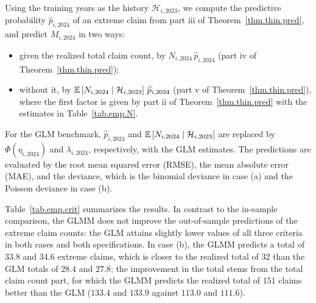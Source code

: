Using the training years as the history \(\mathcal H_{i,2023}\), we
compute the predictive probability \(\widehat p_{i,2024}\) of an extreme
claim from part iii of Theorem~\ref{thm.thin.pred}, and predict
\(M_{i,2024}\) in two ways:
\begin{itemize}
  \item[(a)] given the realized total claim count, by
  \(N_{i,2024}\,\widehat p_{i,2024}\) (part iv of
  Theorem~\ref{thm.thin.pred});
  \item[(b)] without it, by
  \({\mathbb E}\left[N_{i,2024}\mid\mathcal H_{i,2023}\right]\,\widehat p_{i,2024}\)
  (part v of Theorem~\ref{thm.thin.pred}), where the first factor is
  given by part ii of Theorem~\ref{thm.thin.pred} with the estimates in
  Table~\ref{tab.emp.N}.
\end{itemize}
For the GLM benchmark, \(\widehat p_{i,2024}\) and
\({\mathbb E}\left[N_{i,2024}\mid\mathcal H_{i,2023}\right]\) are replaced by
\(\Phi(\eta_{i,2024})\) and \(\lambda_{i,2024}\), respectively, with
the GLM estimates. The predictions are evaluated by the root mean
squared error (RMSE), the mean absolute error (MAE), and the deviance,
which is the binomial deviance in case (a) and the Poisson deviance in
case (b).

Table~\ref{tab.emp.crit} summarizes the results. In contrast to the
in-sample comparison, the GLMM does not improve the out-of-sample
predictions of the extreme claim counts: the GLM attains slightly lower
values of all three criteria in both cases and both specifications. In
case (b), the GLMM predicts a total of \(33.8\) and \(34.6\) extreme
claims, which is closer to the realized total of \(32\) than the GLM
totals of \(28.4\) and \(27.8\); the improvement in the total stems
from the total claim count part, for which the GLMM predicts the
realized total of \(151\) claims better than the GLM (\(133.4\) and
\(133.9\) against \(113.0\) and \(111.6\)).


